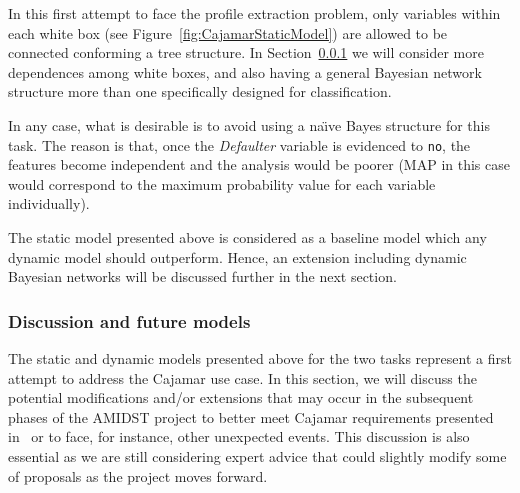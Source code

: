 In this first attempt to face the profile extraction problem, only variables within each white box (see Figure~\ref{fig:CajamarStaticModel}) are allowed to be connected conforming a tree structure. In Section~\ref{subsubsec:CajamarDiscussion} we will consider more dependences among white boxes, and also having a general Bayesian network structure more than one specifically designed for classification. 

In any case, what is desirable is to avoid using a na\"{\i}ve Bayes structure for this task. The reason is that, once the \emph{Defaulter} variable is evidenced to \texttt{no}, the features become independent and the analysis would be poorer (MAP in this case would correspond to the maximum probability value for each variable individually).

The static model presented above is considered as a baseline model which any dynamic model should outperform. Hence, an extension including dynamic Bayesian networks will be discussed further in the next section.


 
\subsubsection{Discussion and future models}\label{subsubsec:CajamarDiscussion}


The static and dynamic models presented above for the two tasks represent a first attempt to address the Cajamar use case. In this section, we will discuss the potential modifications and/or extensions that may occur in the subsequent phases of the AMIDST project to better meet Cajamar requirements presented in~\cite{Fer14b} or to face, for instance, other unexpected events. This discussion is also essential as we are still considering expert advice that could slightly modify some of proposals as the project moves forward.

